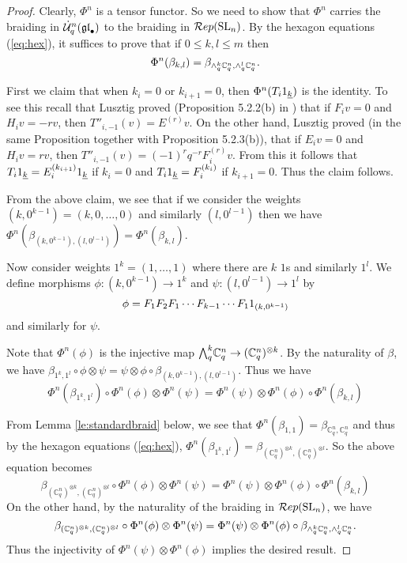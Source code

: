 \documentclass[11pt]{amsart}
\begin{document}
\begin{proof}
Clearly, $\Phi^n$ is a tensor functor.  So we need to show that $ \Phi^n $ carries the braiding in $ \dot{{\mathcal{U}}}_q^n({\mathfrak{gl}}_\bullet) $ to the braiding in $\mathcal{R}ep({\rm{SL}}_n) $.  By the hexagon equations (\ref{eq:hex}), it suffices to prove that if $ 0 \le k, l \le m $ then $$ \Phi^n(\beta_{k, l}) = \beta_{\wedge^{k}_{q} \mathbb C_q^n, \wedge^{l}_{q} \mathbb C_q^n}. $$

First we claim that when $ k_i = 0 $ or $ k_{i+1} = 0 $, then $ \Phi^n(T_i 1_{{\underline{k}}}) $ is the identity.  To see this recall that Lusztig proved (Proposition 5.2.2(b) in \cite{MR1227098}) that if $ F_i v = 0 $ and $ H_i v = -r v $, then $ T''_{i,-1}(v) = E^{(r)} v $.  On the other hand, Lusztig proved (in the same Proposition together with Proposition 5.2.3(b)), that if $ E_i v = 0 $ and $H_i v = rv $, then $ T''_{i,-1}(v) = (-1)^r q^{-r} F_i^{(r)} v $.  From this it follows that $ T_i 1_{{\underline{k}}} = E_i^{(k_{i+1})} 1_{{\underline{k}}} $ if $ k_i = 0 $ and $ T_i 1_{{\underline{k}}} = F_i^{(k_i)} $ if $ k_{i+1} = 0 $.  Thus the claim follows.

From the above claim, we see that if we consider the weights $ (k, 0^{k-1}) = (k, 0, \dots, 0)$ and similarly $ (l, 0^{l-1}) $ then we have $ \Phi^n(\beta_{(k, 0^{k-1}), (l, 0^{l-1})}) =  \Phi^n(\beta_{k, l})$.

Now consider weights $ 1^k = (1, \dots, 1) $ where there are $ k $ $1$s and similarly $ 1^l$.  We define morphisms $ \phi: (k, 0^{k-1})  \rightarrow 1^k$ and  $ \psi : (l, 0^{l-1}) \rightarrow 1^{l} $ by
$$
\phi = F_1 F_2 F_1 \cdots F_{k-1} \cdots F_1 1_{(k, 0^{k-1})}
$$
and similarly for $ \psi $.

Note that $ \Phi^n(\phi) $ is the injective map $ {\textstyle\bigwedge^{k}_{q}} \mathbb C_q^n \rightarrow (\mathbb C_q^n)^{\otimes k} $.  By the naturality of $ \beta $, we have $  \beta_{1^k, 1^l} \circ \phi \otimes \psi =  \psi \otimes \phi \circ \beta_{(k,0^{k-1}), (l, 0^{l-1})} $.  Thus we have
$$
  \Phi^n(\beta_{1^k, 1^l})\circ \Phi^n(\phi) \otimes \Phi^n(\psi) = \Phi^n(\psi) \otimes \Phi^n(\phi) \circ \Phi^n(\beta_{k,l})
$$

From Lemma \ref{le:standardbraid} below, we see that $ \Phi^n(\beta_{1,1}) = \beta_{\mathbb C_q^n, \mathbb C_q^n} $ and thus by the hexagon equations (\ref{eq:hex}), $\Phi^n(\beta_{1^k, 1^l}) = \beta_{(\mathbb C_q^n)^{\otimes k}, (\mathbb C_q^n)^{\otimes l}} $.  So the above equation becomes
$$
 \beta_{(\mathbb C_q^n)^{\otimes k}, (\mathbb C_q^n)^{\otimes l}} \circ \Phi^n(\phi) \otimes \Phi^n(\psi) = \Phi^n(\psi) \otimes \Phi^n(\phi) \circ  \Phi^n(\beta_{k,l})
$$
On the other hand, by the naturality of the braiding in $\mathcal{R}ep({\rm{SL}}_n)$, we have
$$
 \beta_{(\mathbb C_q^n)^{\otimes k}, (\mathbb C_q^n)^{\otimes l}} \circ \Phi^n(\phi) \otimes \Phi^n(\psi) = \Phi^n(\psi) \otimes \Phi^n(\phi) \circ \beta_{\wedge^{k}_{q} \mathbb C_q^n, \wedge^{l}_{q} \mathbb C_q^n}.
$$
Thus the injectivity of $ \Phi^n(\psi) \otimes \Phi^n(\phi)$ implies the desired result.
\end{proof}
\end{document}
